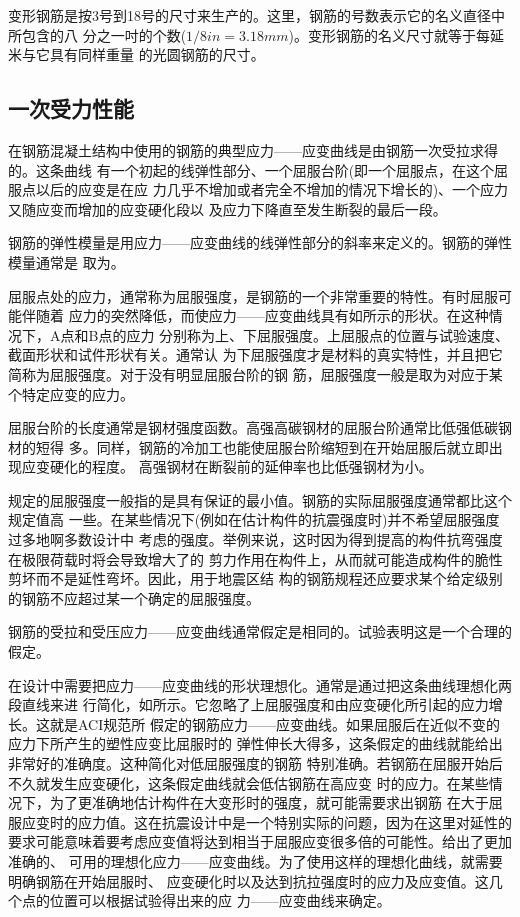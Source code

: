 \documentclass[12pt,a4paper]{book}
\begin{document}
变形钢筋是按3号到18号的尺寸来生产的。这里，钢筋的号数表示它的名义直径中所包含的八
分之一吋的个数($1/8 in=3.18 mm$)。变形钢筋的名义尺寸就等于每延米与它具有同样重量
的光圆钢筋的尺寸。

\subsection{一次受力性能}

在钢筋混凝土结构中使用的钢筋的典型应力——应变曲线是由钢筋一次受拉求得的。这条曲线
有一个初起的线弹性部分、一个屈服台阶(即一个屈服点，在这个屈服点以后的应变是在应
力几乎不增加或者完全不增加的情况下增长的)、一个应力又随应变而增加的应变硬化段以
及应力下降直至发生断裂的最后一段。

钢筋的弹性模量是用应力——应变曲线的线弹性部分的斜率来定义的。钢筋的弹性模量通常是
取为。

屈服点处的应力，通常称为屈服强度，是钢筋的一个非常重要的特性。有时屈服可能伴随着
应力的突然降低，而使应力——应变曲线具有如所示的形状。在这种情况下，A点和B点的应力
分别称为上、下屈服强度。上屈服点的位置与试验速度、截面形状和试件形状有关。通常认
为下屈服强度才是材料的真实特性，并且把它简称为屈服强度。对于没有明显屈服台阶的钢
筋，屈服强度一般是取为对应于某个特定应变的应力。

屈服台阶的长度通常是钢材强度函数。高强高碳钢材的屈服台阶通常比低强低碳钢材的短得
多。同样，钢筋的冷加工也能使屈服台阶缩短到在开始屈服后就立即出现应变硬化的程度。
高强钢材在断裂前的延伸率也比低强钢材为小。

规定的屈服强度一般指的是具有保证的最小值。钢筋的实际屈服强度通常都比这个规定值高
一些。在某些情况下(例如在估计构件的抗震强度时)并不希望屈服强度过多地啊多数设计中
考虑的强度。举例来说，这时因为得到提高的构件抗弯强度在极限荷载时将会导致增大了的
剪力作用在构件上，从而就可能造成构件的脆性剪坏而不是延性弯坏。因此，用于地震区结
构的钢筋规程还应要求某个给定级别的钢筋不应超过某一个确定的屈服强度。

钢筋的受拉和受压应力——应变曲线通常假定是相同的。试验表明这是一个合理的假定。

在设计中需要把应力——应变曲线的形状理想化。通常是通过把这条曲线理想化两段直线来进
行简化，如所示。它忽略了上屈服强度和由应变硬化所引起的应力增长。这就是ACI规范所
假定的钢筋应力——应变曲线。如果屈服后在近似不变的应力下所产生的塑性应变比屈服时的
弹性伸长大得多，这条假定的曲线就能给出非常好的准确度。这种简化对低屈服强度的钢筋
特别准确。若钢筋在屈服开始后不久就发生应变硬化，这条假定曲线就会低估钢筋在高应变
时的应力。在某些情况下，为了更准确地估计构件在大变形时的强度，就可能需要求出钢筋
在大于屈服应变时的应力值。这在抗震设计中是一个特别实际的问题，因为在这里对延性的
要求可能意味着要考虑应变值将达到相当于屈服应变很多倍的可能性。给出了更加准确的、
可用的理想化应力——应变曲线。为了使用这样的理想化曲线，就需要明确钢筋在开始屈服时、
应变硬化时以及达到抗拉强度时的应力及应变值。这几个点的位置可以根据试验得出来的应
力——应变曲线来确定。
\end{document}
